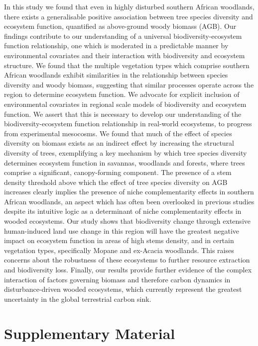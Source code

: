 \begin{refsection}
In this study we found that even in highly disturbed southern African woodlands, there exists a generalisable positive association between tree species diversity and ecosystem function, quantified as above-ground woody biomass (AGB). Our findings contribute to our understanding of a universal biodiversity-ecosystem function relationship, one which is moderated in a predictable manner by environmental covariates and their interaction with biodiversity and ecosystem structure. We found that the multiple vegetation types which comprise southern African woodlands exhibit similarities in the relationship between species diversity and woody biomass, suggesting that similar processes operate across the region to determine ecosystem function. We advocate for explicit inclusion of environmental covariates in regional scale models of biodiversity and ecosystem function. We assert that this is necessary to develop our understanding of the biodiversity-ecosystem function relationship in real-world ecosystems, to progress from experimental mesocosms. We found that much of the effect of species diversity on biomass exists as an indirect effect by increasing the structural diversity of trees, exemplifying a key mechanism by which tree species diversity determines ecosystem function in savannas, woodlands and forests, where trees comprise a significant, canopy-forming component. The presence of a stem density threshold above which the effect of tree species diversity on AGB increases clearly implies the presence of niche complementarity effects in southern African woodlands, an aspect which has often been overlooked in previous studies despite its intuitive logic as a determinant of niche complementarity effects in wooded ecosystems. Our study shows that biodiversity change through extensive human-induced land use change in this region will have the greatest negative impact on ecosystem function in areas of high stems density, and in certain vegetation types, specifically Mopane and ex-Acacia woodlands. This raises concerns about the robustness of these ecosystems to further resource extraction and biodiversity loss. Finally, our results provide further evidence of the complex interaction of factors governing biomass and therefore carbon dynamics in disturbance-driven wooded ecosystems, which currently represent the greatest uncertainty in the global terrestrial carbon sink.

\newpage{}
\begingroup
{}
\printbibliography[heading=subbibintoc]
\endgroup

\section{Supplementary Material}
\label{befr:sec:supp}


\end{refsection}
